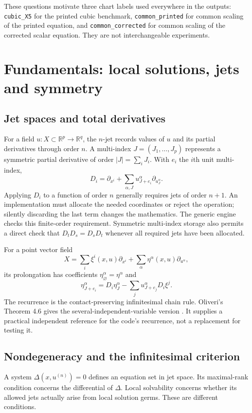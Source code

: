 \documentclass[12pt,a4paper,oneside]{report}
\numberwithin{equation}{chapter}
\DeclareRobustCommand{\code}[1]{\nolinkurl{#1}}
\begin{document}
These questions motivate three chart labels used everywhere in the outputs:
\code{cubic_X5} for the printed cubic benchmark,
\code{common_printed} for common scaling of the printed equation, and
\code{common_corrected} for common scaling of the corrected scalar equation.
They are not interchangeable experiments.

\chapter{Fundamentals: local solutions, jets and symmetry}\label{ch:fundamentals}
\section{Jet spaces and total derivatives}
For a field $u:X\subset\mathbb R^p\to\mathbb R^q$, the $n$-jet records values
of $u$ and its partial derivatives through order $n$. A multi-index
$J=(J_1,\ldots,J_p)$ represents a symmetric partial derivative of order
$|J|=\sum_iJ_i$. With $e_i$ the $i$th unit multi-index,
\begin{equation}\label{eq:total}
D_i=\partial_{x^i}+\sum_{\alpha,J}u^\alpha_{J+e_i}\partial_{u^\alpha_J}.
\end{equation}
Applying $D_i$ to a function of order $n$ generally requires jets of order
$n+1$. An implementation must allocate the needed coordinates or reject the
operation; silently discarding the last term changes the mathematics.
The generic engine checks this finite-order requirement. Symmetric multi-index
storage also permits a direct check that $D_tD_s=D_sD_t$ whenever all required
jets have been allocated.

For a point vector field
\begin{equation}
X=\sum_i\xi^i(x,u)\partial_{x^i}
 +\sum_\alpha\eta^\alpha(x,u)\partial_{u^\alpha},
\end{equation}
its prolongation has coefficients $\eta^\alpha_{\varnothing}=\eta^\alpha$ and
\begin{equation}\label{eq:prolong}
\eta^\alpha_{J+e_i}=D_i\eta^\alpha_J
 -\sum_j u^\alpha_{J+e_j}D_i\xi^j.
\end{equation}
The recurrence is the contact-preserving infinitesimal chain rule. Oliveri's
Theorem 4.6 gives the several-independent-variable version
\cite[Sec.~4.2.2, pp.~91--92]{oliveri2026}. It supplies a practical independent
reference for the code's recurrence, not a replacement for testing it.

\section{Nondegeneracy and the infinitesimal criterion}
A system $\Delta(x,u^{(n)})=0$ defines an equation set in jet space. Its
maximal-rank condition concerns the differential of $\Delta$. Local solvability
concerns whether its allowed jets actually arise from local solution germs.
These are different conditions.
\end{document}
